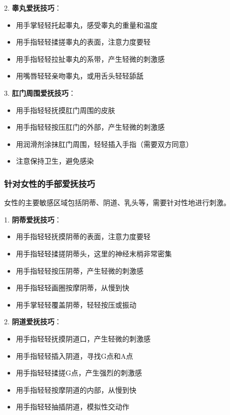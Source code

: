 \documentclass[12pt,UTF8]{ctexbook}
\begin{document}
2. \textbf{睾丸爱抚技巧}：
  \begin{itemize}
  \item 用手掌轻轻托起睾丸，感受睾丸的重量和温度
  \item 用手指轻轻揉搓睾丸的表面，注意力度要轻
  \item 用手指轻轻拉扯睾丸的系带，产生轻微的刺激感
  \item 用嘴唇轻轻亲吻睾丸，或用舌头轻轻舔舐
  \end{itemize}

3. \textbf{肛门周围爱抚技巧}：
  \begin{itemize}
  \item 用手指轻轻抚摸肛门周围的皮肤
  \item 用手指轻轻按压肛门的外部，产生轻微的刺激感
  \item 用润滑剂涂抹肛门周围，轻轻插入手指（需要双方同意）
  \item 注意保持卫生，避免感染
  \end{itemize}

\subsubsection{针对女性的手部爱抚技巧}

女性的主要敏感区域包括阴蒂、阴道、乳头等，需要针对性地进行刺激。

1. \textbf{阴蒂爱抚技巧}：
  \begin{itemize}
  \item 用手指轻轻抚摸阴蒂的表面，注意力度要轻
  \item 用手指轻轻揉搓阴蒂头，这里的神经末梢非常密集
  \item 用手指轻轻按压阴蒂，产生轻微的刺激感
  \item 用手指轻轻画圈按摩阴蒂，从慢到快
  \item 用手掌轻轻覆盖阴蒂，轻轻按压或振动
  \end{itemize}

2. \textbf{阴道爱抚技巧}：
  \begin{itemize}
  \item 用手指轻轻抚摸阴道口，产生轻微的刺激感
  \item 用手指轻轻插入阴道，寻找G点和A点
  \item 用手指轻轻揉搓G点，产生强烈的刺激感
  \item 用手指轻轻按摩阴道的内部，从慢到快
  \item 用手指轻轻抽插阴道，模拟性交动作
  \end{itemize}
\end{document}
